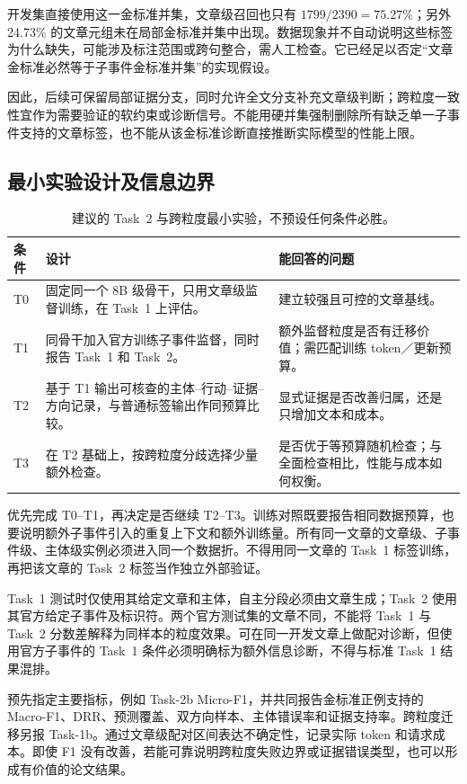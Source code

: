 \documentclass[12pt,a4paper]{article}
\begin{document}
开发集直接使用这一金标准并集，文章级召回也只有 $1799/2390=75.27\%$；另外 24.73\% 的文章元组未在局部金标准并集中出现。数据现象并不自动说明这些标签为什么缺失，可能涉及标注范围或跨句整合，需人工检查。它已经足以否定“文章金标准必然等于子事件金标准并集”的实现假设。

因此，后续可保留局部证据分支，同时允许全文分支补充文章级判断；跨粒度一致性宜作为需要验证的软约束或诊断信号。不能用硬并集强制删除所有缺乏单一子事件支持的文章标签，也不能从该金标准诊断直接推断实际模型的性能上限。

\subsection{最小实验设计及信息边界}
\begin{table}[H]
\centering\small
\caption{建议的 Task~2 与跨粒度最小实验，不预设任何条件必胜。}
\begin{tabularx}{\textwidth}{@{}P{1.2cm}YY@{}}
\toprule
条件 & 设计 & 能回答的问题 \\
\midrule
T0 & 固定同一个 8B 级骨干，只用文章级监督训练，在 Task~1 上评估。 & 建立较强且可控的文章基线。 \\
T1 & 同骨干加入官方训练子事件监督，同时报告 Task~1 和 Task~2。 & 额外监督粒度是否有迁移价值；需匹配训练 token／更新预算。 \\
T2 & 基于 T1 输出可核查的主体--行动--证据--方向记录，与普通标签输出作同预算比较。 & 显式证据是否改善归属，还是只增加文本和成本。 \\
T3 & 在 T2 基础上，按跨粒度分歧选择少量额外检查。 & 是否优于等预算随机检查；与全面检查相比，性能与成本如何权衡。 \\
\bottomrule
\end{tabularx}
\end{table}

优先完成 T0--T1，再决定是否继续 T2--T3。训练对照既要报告相同数据预算，也要说明额外子事件引入的重复上下文和额外训练量。所有同一文章的文章级、子事件级、主体级实例必须进入同一个数据折。不得用同一文章的 Task~1 标签训练，再把该文章的 Task~2 标签当作独立外部验证。

Task~1 测试时仅使用其给定文章和主体，自主分段必须由文章生成；Task~2 使用其官方给定子事件及标识符。两个官方测试集的文章不同，不能将 Task~1 与 Task~2 分数差解释为同样本的粒度效果。可在同一开发文章上做配对诊断，但使用官方子事件的 Task~1 条件必须明确标为额外信息诊断，不得与标准 Task~1 结果混排。

预先指定主要指标，例如 Task-2b Micro-F1，并共同报告金标准正例支持的 Macro-F1、DRR、预测覆盖、双方向样本、主体错误率和证据支持率。跨粒度迁移另报 Task-1b。通过文章级配对区间表达不确定性，记录实际 token 和请求成本。即使 F1 没有改善，若能可靠说明跨粒度失败边界或证据错误类型，也可以形成有价值的论文结果。
\end{document}
